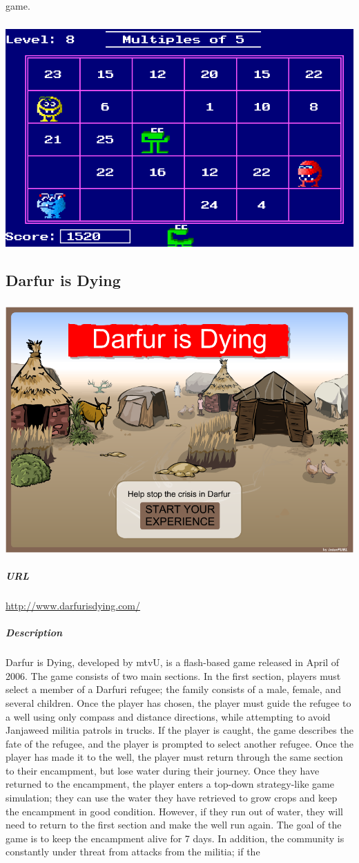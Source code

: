 game.\subparagraph{}\includegraphics[width = \textwidth]{img/munchers_screen.png}\subsection{Darfur is Dying}\subparagraph{}\includegraphics[width = \textwidth]{img/darfur_title.png}\subparagraph{URL}\url{http://www.darfurisdying.com/}\subparagraph{Description}Darfur is Dying, developed by mtvU, is a flash-based game released in April of 2006. The game consists of two main sections. In the first section, players must select a member of a Darfuri refugee; the family consists of a male, female, and several children. Once the player has chosen, the player must guide the refugee to a well using only compass and distance directions, while attempting to avoid Janjaweed militia patrols in trucks. If the player is caught, the game describes the fate of the refugee, and the player is prompted to select another refugee. Once the player has made it to the well, the player must return through the same section to their encampment, but lose water during their journey. Once they have returned to the encampment, the player enters a top-down strategy-like game simulation; they can use the water they have retrieved to grow crops and keep the encampment in good condition. However, if they run out of water, they will need to return to the first section and make the well run again. The goal of the game is to keep the encampment alive for 7 days. In addition, the community is constantly under threat from attacks from the militia; if the 